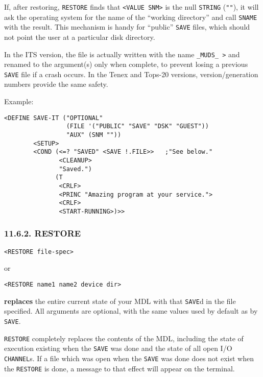 \documentclass[a4paper,]{article}
\begin{document}
If, after restoring, \texttt{RESTORE} finds that \texttt{\textless{}VALUE\ SNM\textgreater{}} is the null \texttt{STRING}
(\texttt{""}), it will ask the operating system for the name of the ``working directory'' and call \texttt{SNAME} with the
result. This mechanism is handy for ``public'' \texttt{SAVE} files, which should not point the user at a particular disk
directory.

In the ITS  version, the file is actually written with the name \texttt{\_MUDS\_\ \textgreater{}} and
renamed to the argument(s) only when complete, to prevent losing a previous \texttt{SAVE} file if a crash occurs. In the
Tenex  and Tops-20  versions, version/generation numbers provide the same
safety.

Example:

\begin{verbatim}
<DEFINE SAVE-IT ("OPTIONAL"
                 (FILE '("PUBLIC" "SAVE" "DSK" "GUEST"))
                 "AUX" (SNM ""))
        <SETUP>
        <COND (<=? "SAVED" <SAVE !.FILE>>   ;"See below."
               <CLEANUP>
               "Saved.")
              (T
               <CRLF>
               <PRINC "Amazing program at your service.">
               <CRLF>
               <START-RUNNING>)>>
\end{verbatim}

\subsubsection{11.6.2. RESTORE}\label{restore}

\begin{verbatim}
<RESTORE file-spec>
\end{verbatim}

or

\begin{verbatim}
<RESTORE name1 name2 device dir>
\end{verbatim}

 \textbf{replaces} the entire current state of your MDL with that \texttt{SAVE}d in the file
specified. All arguments are optional, with the same values used by default as by \texttt{SAVE}.

\texttt{RESTORE} completely replaces the contents of the MDL, including the state of execution existing when the
\texttt{SAVE} was done and the state of all open I/O \texttt{CHANNEL}s. If a file which was open when the \texttt{SAVE} was
done does not exist when the \texttt{RESTORE} is done, a message to that effect will appear on the terminal.
\end{document}
